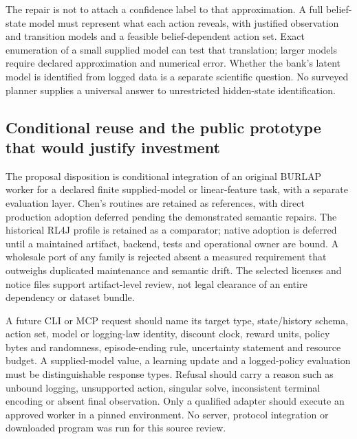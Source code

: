 The repair is not to attach a confidence label to that approximation. A full belief-state model must represent what each action reveals, with justified observation and transition models and a feasible belief-dependent action set. Exact enumeration of a small supplied model can test that translation; larger models require declared approximation and numerical error. Whether the bank's latent model is identified from logged data is a separate scientific question. No surveyed planner supplies a universal answer to unrestricted hidden-state identification.

\subsection{Conditional reuse and the public prototype that would justify investment}
The proposal disposition is conditional integration of an original BURLAP worker for a declared finite supplied-model or linear-feature task, with a separate evaluation layer. Chen's routines are retained as references, with direct production adoption deferred pending the demonstrated semantic repairs. The historical RL4J profile is retained as a comparator; native adoption is deferred until a maintained artifact, backend, tests and operational owner are bound. A wholesale port of any family is rejected absent a measured requirement that outweighs duplicated maintenance and semantic drift. The selected licenses and notice files support artifact-level review, not legal clearance of an entire dependency or dataset bundle.~\citep{exec24_policyjava_comparison}

A future CLI or MCP request should name its target type, state/history schema, action set, model or logging-law identity, discount clock, reward units, policy bytes and randomness, episode-ending rule, uncertainty statement and resource budget. A supplied-model value, a learning update and a logged-policy evaluation must be distinguishable response types. Refusal should carry a reason such as unbound logging, unsupported action, singular solve, inconsistent terminal encoding or absent final observation. Only a qualified adapter should execute an approved worker in a pinned environment. No server, protocol integration or downloaded program was run for this source review.~\citep{exec24_policyjava_comparison}

